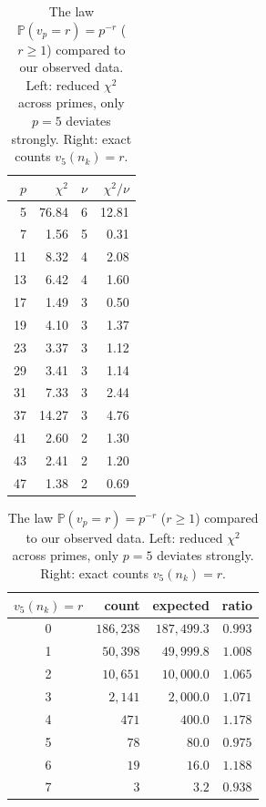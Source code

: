 \documentclass[12pt]{amsart}%
\newcommand{\1}{\mathds{1}}
\theoremstyle{definition}
\numberwithin{equation}{section}
\numberwithin{table}{section}
\numberwithin{figure}{section}
\begin{document}
\begin{table}[H]
\centering
\begin{minipage}[t]{0.42\linewidth}
\centering
\begin{tabular}{r r r r}
\toprule
$p$ & $\chi^2$ & $\nu$ & $\chi^2/\nu$\\
\midrule
5  & 76.84 & 6 & 12.81\\
7  & 1.56  & 5 & 0.31\\
11 & 8.32  & 4 & 2.08\\
13 & 6.42  & 4 & 1.60\\
17 & 1.49  & 3 & 0.50\\
19 & 4.10  & 3 & 1.37\\
23 & 3.37  & 3 & 1.12\\
29 & 3.41  & 3 & 1.14\\
31 & 7.33  & 3 & 2.44\\
37 & 14.27 & 3 & 4.76\\
41 & 2.60  & 2 & 1.30\\
43 & 2.41  & 2 & 1.20\\
47 & 1.38  & 2 & 0.69\\
\bottomrule
\end{tabular}
\label{tab:chi2-vs-prime}
\end{minipage}
\hfill
\begin{minipage}[t]{0.54\linewidth}
\centering
\begin{tabular}{c r r c}
\toprule
$v_5(n_k)= r$ & count & expected & ratio\\
\midrule
0 & $186{,}238$ & $187{,}499.3$ & $0.993$ \\
1 &  $50{,}398$ &  $49{,}999.8$ & $1.008$ \\
2 &  $10{,}651$ &  $10{,}000.0$ & $1.065$ \\
3 &   $2{,}141$ &   $2{,}000.0$ & $1.071$ \\
4 &         $471$ &         $400.0$ & $1.178$ \\
5 &          $78$ &          $80.0$ & $0.975$ \\
6 &          $19$ &          $16.0$ & $1.188$ \\
7 &           $3$ &           $3.2$ & $0.938$ \\
\bottomrule
\end{tabular}
\label{tab:v5-exact}
\end{minipage}
\caption{The law $\mathbb{P}(v_p=r)=p^{-r}$ ($r\ge1$) compared to our observed data. Left: reduced $\chi^2$ across primes, only $p=5$ deviates strongly. Right: exact counts $v_5(n_k)=r$.}
\label{tab:chi2-and-v5-exact}
\end{table}
\end{document}

